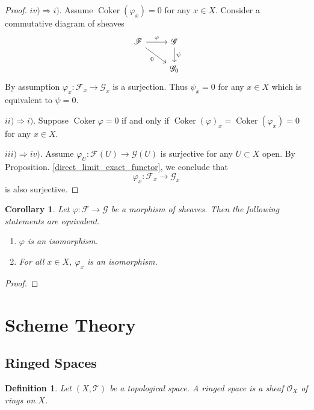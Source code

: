 \documentclass{article}
\newtheorem{definition}{Definition}[section]
\newtheorem{corollary}{Corollary}[section]
\numberwithin{equation}{section}
\DeclareMathOperator{\Coker}{Coker}
\begin{document}
\begin{proof}
\par $iv)\Rightarrow i)$. Assume $\Coker(\varphi_x)=0$ for any $x\in X$. Consider a commutative diagram of sheaves
\[
\begin{tikzcd}
\mathcal{F} \arrow[r, "\varphi"] \arrow[rd, "0"'] & \mathcal{G} \arrow[d, "\psi"] \\
                                                  & \mathcal{G}_0                
\end{tikzcd}
\]
By assumption $\varphi_x:\mathcal{F}_x\to\mathcal{G}_x$ is a surjection. Thus $\psi_x=0$ for any $x\in X$ which is equivalent to $\psi=0$.\\
\par $ii)\Rightarrow i)$. Suppose $\Coker\varphi=0$ if and only if $\Coker(\varphi)_x=\Coker(\varphi_x)=0$ for any $x\in X$. \\
\par $iii)\Rightarrow iv)$. Assume $\varphi_U:\mathcal{F}(U)\to\mathcal{G}(U)$ is surjective for any $U\subset X$ open. By Proposition. \ref{direct_limit_exact_functor}, we conclude that 
\begin{equation*}
\varphi_x:\mathcal{F}_x\to\mathcal{G}_x
\end{equation*}
is also surjective.
\end{proof}

\begin{corollary}
Let $\varphi:\mathcal{F}\to\mathcal{G}$ be a morphism of sheaves. Then the following statements are equivalent.
\begin{enumerate}[1).]
\item $\varphi$ is an isomorphism.
\item For all $x\in X$, $\varphi_x$ is an isomorphism. 
\end{enumerate}
\end{corollary}

\begin{proof}

\end{proof}

\section{Scheme Theory}

\subsection{Ringed Spaces}

\begin{definition}
Let $(X,\mathcal{T})$ be a topological space. A ringed space is a sheaf $\mathcal{O}_X$ of rings on $X$. 
\end{definition}
\end{document}
